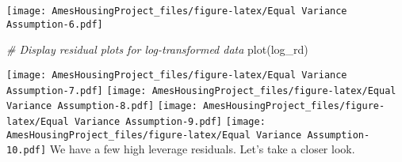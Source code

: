 \documentclass[
]{article}
\newenvironment{Shaded}{\begin{snugshade}}{\end{snugshade}}
\newcommand{\AttributeTok}[1]{\textcolor[rgb]{0.77,0.63,0.00}{#1}}
\newcommand{\CommentTok}[1]{\textcolor[rgb]{0.56,0.35,0.01}{\textit{#1}}}
\newcommand{\ConstantTok}[1]{\textcolor[rgb]{0.00,0.00,0.00}{#1}}
\newcommand{\DecValTok}[1]{\textcolor[rgb]{0.00,0.00,0.81}{#1}}
\newcommand{\FunctionTok}[1]{\textcolor[rgb]{0.00,0.00,0.00}{#1}}
\newcommand{\NormalTok}[1]{#1}
\newcommand{\OtherTok}[1]{\textcolor[rgb]{0.56,0.35,0.01}{#1}}
\newcommand{\SpecialCharTok}[1]{\textcolor[rgb]{0.00,0.00,0.00}{#1}}
\newcommand{\StringTok}[1]{\textcolor[rgb]{0.31,0.60,0.02}{#1}}
\begin{document}
\begin{Shaded}
\end{Shaded}

\texttt{[image: AmesHousingProject\_files/figure-latex/Equal Variance Assumption-6.pdf]}

\begin{Shaded}
\begin{Highlighting}[]
\CommentTok{\# Display residual plots for log{-}transformed data}
\FunctionTok{plot}\NormalTok{(log\_rd)}
\end{Highlighting}
\end{Shaded}

\texttt{[image: AmesHousingProject\_files/figure-latex/Equal Variance Assumption-7.pdf]}
\texttt{[image: AmesHousingProject\_files/figure-latex/Equal Variance Assumption-8.pdf]}
\texttt{[image: AmesHousingProject\_files/figure-latex/Equal Variance Assumption-9.pdf]}
\texttt{[image: AmesHousingProject\_files/figure-latex/Equal Variance Assumption-10.pdf]}
We have a few high leverage residuals. Let's take a closer look.
\end{document}
